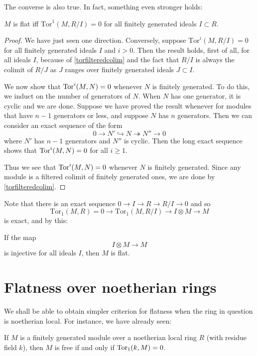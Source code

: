 The converse is also true. In fact, something even stronger holds:
\begin{proposition} $M$ is flat iff $\mathrm{Tor} ^1(M,R/I)=0$ for all finitely generated ideals $I \subset R$.
\end{proposition}
\begin{proof}
We have just seen one direction. 
Conversely, suppose $\mathrm{Tor} ^i(M,R/I) = 0$ for all finitely generated
ideals $I$ and $i>0$. 
Then the result holds, first of all, for all ideals $I$, because of
\cref{torfilteredcolim} and the fact that $R/I$ is always the colimit of $R/J$
as $J$ ranges over finitely generated ideals $J \subset I$.

We now show that $\operatorname{Tor}^i(M, N) = 0$ whenever $N$ is finitely generated. To do
this, we induct on the number of generators of $N$. When $N$ has one
generator, it is cyclic and we are done. Suppose we have proved the result
whenever for modules that have $n-1$ generators or less, and suppose $N$ has
$n$ generators.
Then we can consider an exact sequence of the form
\[ 0 \to N' \hookrightarrow N \twoheadrightarrow N'' \to 0  \]
where $N'$ has $n-1$ generators and $N''$ is cyclic. Then the long exact
sequence shows that $\operatorname{Tor}^i(M, N) = 0$ for all $i \geq 1$.

Thus we see that $\operatorname{Tor}^i(M, N)  = 0$ whenever $N$ is finitely generated. Since
any module is a filtered colimit of finitely generated ones, we are done by
\cref{torfilteredcolim}.
\end{proof}


Note that there is an exact sequence $0 \to I \to R \to R/I \to 0$ and
so
\[ \mathrm{Tor} _1(M,R)=0 \to \mathrm{Tor} _1(M,R/I) \to I \otimes M \to M \]
is exact, and by this:

\begin{corollary} 
If the map
\[ I \otimes M \to M \]
is injective for all ideals $I$, then $M$ is flat.
\end{corollary} 


\section{Flatness over noetherian rings}

We shall be able to obtain simpler criterion for flatness when the ring in
question is noetherian local. For instance, we have already seen:

\begin{theorem} 
If $M$ is a finitely generated module over a noetherian local ring $R$ (with
residue field $k$), then $M$ is free if and only if
$\operatorname{Tor}_1(k, M) = 0$.
\end{theorem} 

